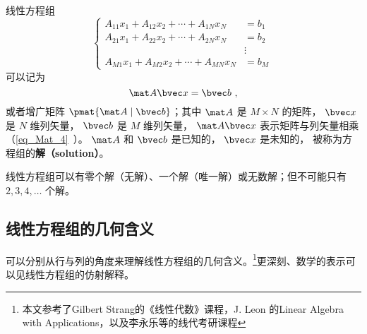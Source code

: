 
\begin{issues}
\issueDraft
\end{issues}


线性方程组
\begin{equation}
\begin{cases}
A_{11} x_1 + A_{12} x_2 + \cdots + A_{1N} x_N &= b_1 \\
A_{21} x_1 + A_{22} x_2 + \cdots + A_{2N} x_N &= b_2 \\
&\vdots \\
A_{M1} x_1 + A_{M2} x_2 + \cdots + A_{MN} x_N &= b_M
\end{cases} ~
\end{equation}
可以记为
\begin{equation}\label{eq_LinEq_1}
\mat A \bvec x = \bvec b~,
\end{equation}
或者增广矩阵 $\pmat{\mat A \mid \bvec b}$；其中 $\mat A$ 是 $M \times N$ 的矩阵， $\bvec x$ 是 $N$ 维列矢量， $\bvec b$ 是 $M$ 维列矢量， $\mat A \bvec x$ 表示矩阵与列矢量相乘（\autoref{eq_Mat_4}~）。 $\mat A$ 和 $\bvec b$ 是已知的， $\bvec x$ 是未知的， 被称为方程组的\textbf{解（solution）}。

线性方程组可以有零个解（无解）、一个解（唯一解）或无数解；但不可能只有 $2,3,4,\dots$ 个解。


\subsection{线性方程组的几何含义}\label{sub_LinEq_2}
可以分别从行与列的角度来理解线性方程组的几何含义。\footnote{本文参考了Gilbert Strang的《线性代数》课程，J. Leon 的Linear Algebra with Applications，以及李永乐等的线代考研课程}更深刻、数学的表示可以见线性方程组的仿射解释。

